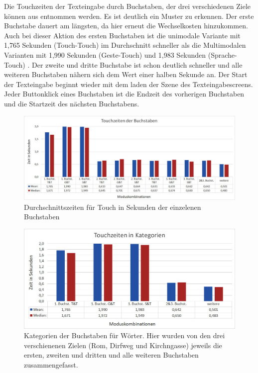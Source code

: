 Die Touchzeiten der Texteingabe durch Buchstaben, der drei verschiedenen Ziele können aus  entnommen werden. 
Es ist deutlich ein Muster zu erkennen. 
Der erste Buchstabe dauert am längsten, da hier erneut die Wechselkosten hinzukommen. 
Auch bei dieser Aktion des ersten Buchstaben ist die unimodale Variante mit 1,765 Sekunden (Touch-Touch) im Durchschnitt schneller als die Multimodalen Varianten mit 1,990 Sekunden (Geste-Touch) und 1,983 Sekunden (Sprache-Touch) .
Der zweite und dritte Buchstabe ist schon deutlich schneller und alle weiteren Buchstaben nähern sich dem Wert einer halben Sekunde an. 
Der Start der Texteingabe beginnt wieder mit dem laden der Szene des Texteingabescreens. Jeder Buttonklick eines Buchstaben ist die Endzeit des vorherigen Buchstaben und die Startzeit des nächsten Buchstabens.
\begin{figure}[ht]
  \centering
  \includegraphics[width=1\textwidth]{img/TouchzeitenBuchstabenGesamt.jpg}
  \caption{Durchschnittszeiten für Touch in Sekunden der einzelenen Buchstaben}
  \label{fig:TouchzeitenB_Ges}
\end{figure}
\begin{figure}[ht]
  \centering
  \includegraphics[width=1\textwidth]{img/TouchzeitenKategorien.JPG}
  \caption[Kategorien der Buchstaben für Wörter.]{Kategorien der Buchstaben für Wörter. Hier wurden von den drei verschienenen Zielen (Rom, Dirfweg und Kirchngasse) jeweils die ersten, zweiten und dritten und alle weiteren Buchstaben zusammengefasst.}
  \label{fig:Kategorien}
\end{figure} 

